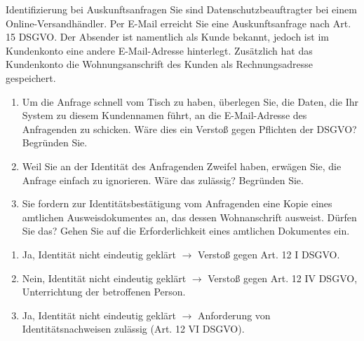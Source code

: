 \documentclass{article}
\begin{document}
\begin{exercise}{Identifizierung bei Auskunftsanfragen}
  Sie sind Datenschutzbeauftragter bei einem Online-Versandhändler. Per E-Mail erreicht Sie eine Auskunftsanfrage nach Art. 15 DSGVO. Der Absender ist namentlich als Kunde bekannt, jedoch ist im Kundenkonto eine andere E-Mail-Adresse hinterlegt. Zusätzlich hat das Kundenkonto die Wohnungsanschrift des Kunden als Rechnungsadresse gespeichert.
  \begin{enumerate}
    \item Um die Anfrage schnell vom Tisch zu haben, überlegen Sie, die Daten, die Ihr System zu diesem Kundennamen führt, an die E-Mail-Adresse des Anfragenden zu schicken. Wäre dies ein Verstoß gegen Pflichten der DSGVO? Begründen Sie.
    \item Weil Sie an der Identität des Anfragenden Zweifel haben, erwägen Sie, die Anfrage einfach zu ignorieren. Wäre das zulässig? Begründen Sie.
    \item Sie fordern zur Identitätsbestätigung vom Anfragenden eine Kopie eines amtlichen Ausweisdokumentes an, das dessen Wohnanschrift ausweist. Dürfen Sie das? Gehen Sie auf die Erforderlichkeit eines amtlichen Dokumentes ein.
  \end{enumerate}

  \begin{solution}
    \begin{enumerate}
      \item Ja, Identität nicht eindeutig geklärt $\to$ Verstoß gegen Art. 12 I DSGVO.
      \item Nein, Identität nicht eindeutig geklärt $\to$ Verstoß gegen Art. 12 IV DSGVO, Unterrichtung der betroffenen Person.
      \item Ja, Identität nicht eindeutig geklärt $\to$ Anforderung von Identitätsnachweisen zulässig (Art. 12 VI DSGVO).
    \end{enumerate}
  \end{solution}
\end{exercise}
\end{document}
